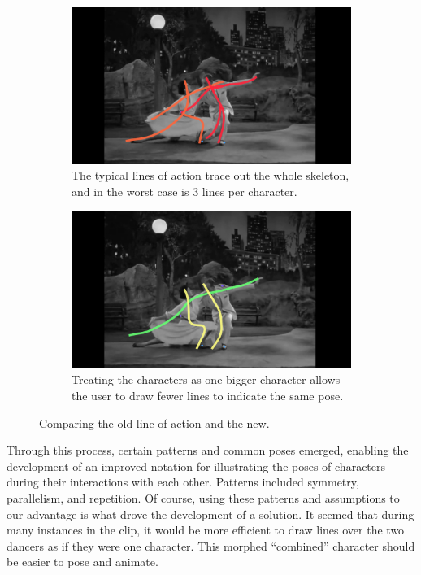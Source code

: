 \begin{figure}[h!]
	\centering
        \begin{subfigure}[b!]{0.45\textwidth}
        	\centering
                \includegraphics[width=\linewidth]{img/keyframe_case_7_baseline}
                \caption{The typical lines of action trace out the whole skeleton, and in the worst case is 3 lines per character.}
                \label{fig:baseline}
        \end{subfigure}
        \quad
        \begin{subfigure}[b!]{0.45\textwidth}
        	\centering
                \includegraphics[width=\linewidth]{img/keyframe_case_7_new}
                \caption{Treating the characters as one bigger character allows the user to draw fewer lines to indicate the same pose.}
                \label{fig:new_notation}
        \end{subfigure}%
        \caption{Comparing the old line of action and the new.}
	\label{fig:poses}
\end{figure}

Through this process, certain patterns and common poses emerged, enabling the development of an improved notation for illustrating the poses of characters during their interactions with each other. Patterns included symmetry, parallelism, and repetition. Of course, using these patterns and assumptions to our advantage is what drove the development of a solution. It seemed that during many instances in the clip, it would be more efficient to draw lines over the two dancers as if they were one character. This morphed ``combined'' character should be easier to pose and animate.

